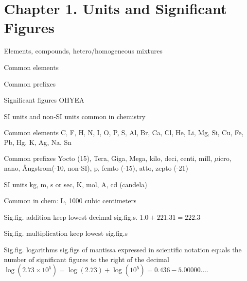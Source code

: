 \section{Chapter 1. Units and Significant Figures}

{\footnotesize
\begin{multicols}{3}
\begin{compactenum}
    \item Elements,  compounds,  hetero/homogeneous mixtures
    \item Common elements
    \item Common prefixes
    \item Significant figures OHYEA
    \item SI units and non-SI units common in chemistry
\end{compactenum}
\end{multicols}
}

\begin{mdframed}
\begin{multicols}{2}
\begin{compactdesc}
    \item[Common elements] C, F, H, N, I, O, P, S, Al, Br, Ca, Cl, He, Li, Mg, Si, Cu, Fe, Pb,
        Hg, K, Ag, Na, Sn
    \item[Common prefixes] Yocto (15),  Tera,  Giga,  Mega,  kilo,  deci,  centi,
        mill,  $\mu$icro,  nano,  \r{A}ngstrom(-10,  non-SI),  p,  femto (-15),  atto,
        zepto (-21)
    \item[SI units] kg, m, s or sec, K, mol, A, cd (candela)
    \item[Common in chem:] L, 1000 cubic centimeters
    \item[Sig.fig. addition] keep lowest decimal sig.fig.s. $1.0 + 221.31 = 222.3$
    \item[Sig.fig. multiplication] keep lowest sig.fig.s
    \item[Sig.fig. logarithms] sig.figs of mantissa expressed in scientific
        notation equals the number of significant figures to the right of the decimal
        $\log(2.73 ×10^5) = \log(2.73) + \log(10^5) = 0.436 - 5.00000...$.
\end{compactdesc}
\end{multicols}
\end{mdframed}
